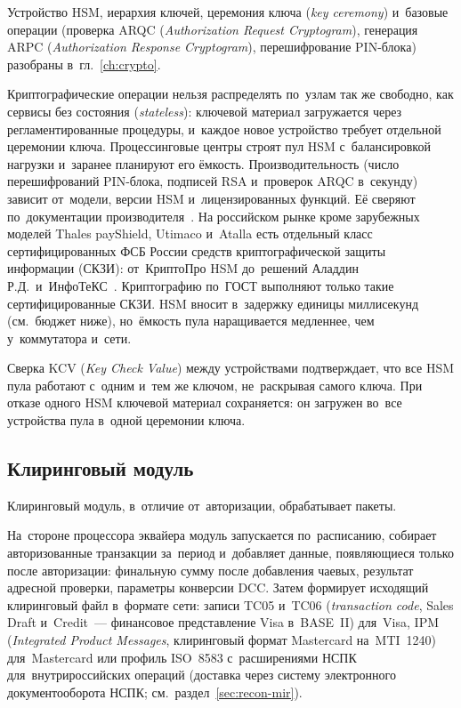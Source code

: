 Устройство HSM, иерархия ключей, церемония ключа (\textit{key ceremony})
и~базовые операции (проверка ARQC
  (\textit{Authorization Request Cryptogram}), генерация ARPC
(\textit{Authorization Response Cryptogram}), перешифрование PIN-блока) разобраны
в~гл.~\ref{ch:crypto}.

Криптографические операции нельзя распределять по~узлам так же свободно, как
сервисы без состояния (\textit{stateless}): ключевой материал загружается через
регламентированные процедуры, и~каждое новое устройство требует отдельной
церемонии ключа. Процессинговые центры строят пул HSM с~балансировкой нагрузки
и~заранее планируют его ёмкость. Производительность (число
перешифрований PIN-блока, подписей RSA и~проверок ARQC в~секунду) зависит от~модели,
версии HSM и~лицензированных функций. Её сверяют по~документации
производителя~\cite{pci-pin-security,pci-pts-hsm,ansi-x9-24}. На российском
рынке кроме зарубежных моделей Thales payShield, Utimaco и~Atalla есть
отдельный класс сертифицированных ФСБ России средств криптографической защиты
информации (СКЗИ): от~КриптоПро HSM до~решений Аладдин Р.Д.\ и~ИнфоТеКС~\cite{cryptopro-hsm-cert}.
Криптографию по~ГОСТ выполняют только такие сертифицированные СКЗИ. HSM вносит
в~задержку единицы миллисекунд (см.~бюджет ниже), но~ёмкость пула
наращивается медленнее, чем у~коммутатора и~сети.


Сверка KCV (\textit{Key Check Value}) между устройствами подтверждает,
что все HSM пула работают с~одним и~тем же ключом, не~раскрывая самого ключа.
При отказе одного HSM ключевой материал сохраняется: он загружен во~все
устройства пула в~одной церемонии ключа.

\subsection*{Клиринговый модуль}

Клиринговый модуль, в~отличие от~авторизации, обрабатывает пакеты.

На~стороне процессора эквайера модуль запускается по~расписанию, собирает
авторизованные транзакции за~период и~добавляет данные, появляющиеся только
после авторизации: финальную сумму после добавления чаевых, результат
адресной проверки, параметры конверсии DCC. Затем формирует исходящий
клиринговый файл в~формате сети: записи TC05 и~TC06 (\textit{transaction code},
Sales Draft и~Credit~--- финансовое представление Visa в~BASE~II) для~Visa, IPM (\textit{Integrated Product
Messages}, клиринговый формат Mastercard на~MTI~1240) для~Mastercard или
профиль ISO~8583 с~расширениями НСПК для~внутрироссийских операций (доставка
  через систему электронного документооборота НСПК;
см.~раздел~\ref{sec:recon-mir}).~\cite{visa-core-rules,visa-acceptance-edit-package,mc-tpr,nspk-mir-rules}

